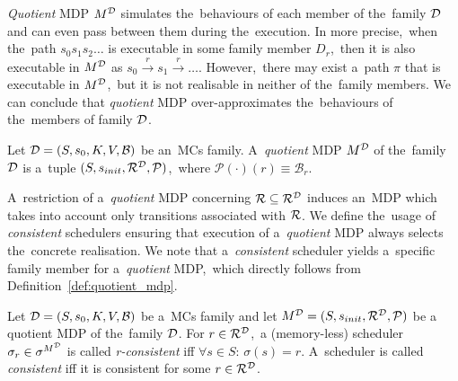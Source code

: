 \textit{Quotient} MDP $M^{\mathcal{D}}$ simulates the~behaviours of each member of the~family $\mathcal{D}$ and can even pass between them during the~execution.
In more precise,~when the~path $s_0s_1s_2 \dots$ is executable in some family member $D_r$,~then it is also executable in $M^{\mathcal{D}}$ as $s_0 \overset{r}{\rightarrow} s_1 \overset{r}{\rightarrow} \dots$.
However,~there may exist a~path $\pi$ that is executable in $M^{\mathcal{D}}$,~but it is not realisable in neither of the~family members.
We can conclude that \textit{quotient} MDP over-approximates the~behaviours of the~members of family $\mathcal{D}$.

\begin{definition} \label{def:quotient_mdp}
\cite{roman-DP}
Let $\mathcal{D} = (S,s_{0},K, V, \mathcal{B})$ be an~MCs family.
A~\textit{quotient} MDP $M^{\mathcal{D}}$ of the~family $\mathcal{D}$ is a~tuple $(S, s_{init}, \mathcal{R}^{\mathcal{D}}, \mathcal{P})$,~where $\mathcal{P}(\cdot)(r) \equiv \mathcal{B}_r$.
\end{definition}

A~restriction of a~\textit{quotient} MDP concerning $\mathcal{R} \subseteq \mathcal{R}^{\mathcal{D}}$ induces an~MDP which takes into account only transitions associated with $\mathcal{R}$.
We define the~usage of \textit{consistent} schedulers ensuring that execution of a~\textit{quotient} MDP always selects the~concrete realisation.
We note that a~\textit{consistent} scheduler yields a~specific family member for a~\textit{quotient} MDP,~which directly follows from Definition~\ref{def:quotient_mdp}.

\begin{definition}
\cite{roman-DP}
Let $\mathcal{D} = (S,s_{0},K, V, \mathcal{B})$ be a~MCs family and let $M^{\mathcal{D}} = (S, s_{init}, \mathcal{R}^{\mathcal{D}}, \mathcal{P})$ be a quotient MDP of the~family $\mathcal{D}$.
For $r \in \mathcal{R}^{\mathcal{D}}$,~a (memory-less) scheduler $\sigma_r \in \sigma^{M^{\mathcal{D}}}$ is called \textit{r-consistent} iff $\forall s \in S: \, \sigma(s) = r$.
A~scheduler is called \textit{consistent} iff it is consistent for some $r \in \mathcal{R}^{\mathcal{D}}$.
\end{definition}
